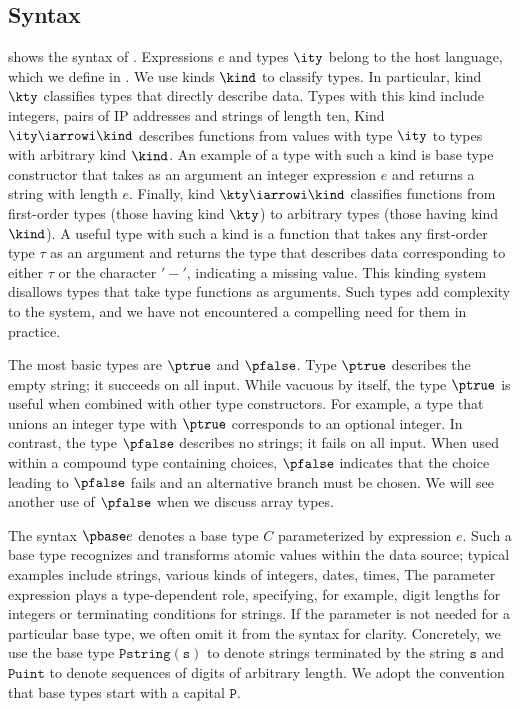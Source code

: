 \subsection{\ddca{} Syntax}
\label{sec:ddc-syntax}

 shows the syntax of \ddc{}. Expressions $e$
and types $\ity$ belong to the host language, which we define in .  
We use kinds $\kind$ to classify types. 
In particular, kind $\kty$ classifies types that directly describe
data.  Types with this kind include integers, 
pairs of IP addresses and strings of length ten, \etc{}
Kind $\ity \iarrowi \kind$ describes
functions from values with type $\ity$ to types with arbitrary kind
$\kind$.  An example of a type with such a kind is base type
constructor  that takes as an argument an integer
expression $e$ and returns a string with length $e$.
Finally, kind $\kty \iarrowi \kind$ classifies
functions from first-order types (those having kind $\kty$) to
arbitrary types (those having kind $\kind$).  
A useful type with such a kind is a function that takes any
first-order type $\tau$ as an argument and returns the type that
describes data corresponding to either $\tau$ or the character
$\mathtt{'-'}$, indicating a missing value.
This kinding system disallows types that take type functions as
arguments.  Such types add complexity to the system, and we have not
encountered a compelling need for them in practice. 

The most basic types are $\ptrue$ and $\pfalse$.  Type $\ptrue$
describes the empty string; it succeeds on all input.  While vacuous
by itself, the type $\ptrue$ is useful when combined with 
other type constructors.  For example, a type that unions an integer
type with $\ptrue$ corresponds to an optional integer.  In contrast,
the type $\pfalse$ describes no strings; it fails on all input.  
When used within a compound type containing choices, $\pfalse$
indicates that the choice leading to $\pfalse$ fails and an
alternative branch must be chosen.  We will see another use of
$\pfalse$ when we discuss array types.

The syntax $\pbase e$ denotes a base type $C$ parameterized by 
expression $e$.  
 Such a base type recognizes and transforms atomic values within the data
 source; typical examples include strings, various kinds of integers,
 dates, times, \etc{} The parameter expression plays a type-dependent role,
 specifying, for example, digit lengths for integers or terminating
 conditions for strings. If the parameter is not needed for a
 particular base type, we often omit it from the syntax for
 clarity. Concretely, we use the base type $\mathtt{Pstring(s)}$
 to denote strings terminated by the string $\mathtt{s}$
 and $\mathtt{Puint}$ to denote sequences of digits of arbitrary
 length.  We adopt the convention that base types start with a
 capital $\mathtt{P}$.

